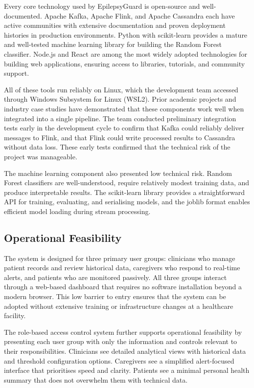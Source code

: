 \documentclass[12pt, a4paper, oneside]{report}
\begin{document}
Every core technology used by EpilepsyGuard is open-source and well-documented. Apache Kafka, Apache Flink, and Apache Cassandra each have active communities with extensive documentation and proven deployment histories in production environments. Python with scikit-learn provides a mature and well-tested machine learning library for building the Random Forest classifier. Node.js and React are among the most widely adopted technologies for building web applications, ensuring access to libraries, tutorials, and community support.

All of these tools run reliably on Linux, which the development team accessed through Windows Subsystem for Linux (WSL2). Prior academic projects and industry case studies have demonstrated that these components work well when integrated into a single pipeline. The team conducted preliminary integration tests early in the development cycle to confirm that Kafka could reliably deliver messages to Flink, and that Flink could write processed results to Cassandra without data loss. These early tests confirmed that the technical risk of the project was manageable.

The machine learning component also presented low technical risk. Random Forest classifiers are well-understood, require relatively modest training data, and produce interpretable results. The scikit-learn library provides a straightforward API for training, evaluating, and serialising models, and the joblib format enables efficient model loading during stream processing.

\subsection{Operational Feasibility}

The system is designed for three primary user groups: clinicians who manage patient records and review historical data, caregivers who respond to real-time alerts, and patients who are monitored passively. All three groups interact through a web-based dashboard that requires no software installation beyond a modern browser. This low barrier to entry ensures that the system can be adopted without extensive training or infrastructure changes at a healthcare facility.

The role-based access control system further supports operational feasibility by presenting each user group with only the information and controls relevant to their responsibilities. Clinicians see detailed analytical views with historical data and threshold configuration options. Caregivers see a simplified alert-focused interface that prioritises speed and clarity. Patients see a minimal personal health summary that does not overwhelm them with technical data.
\end{document}

